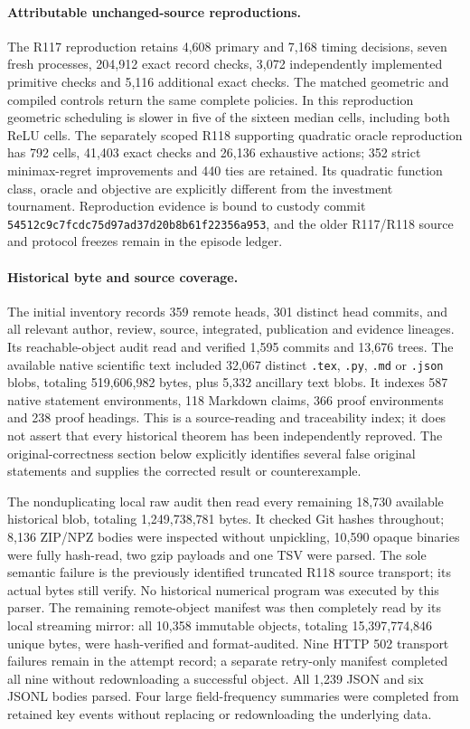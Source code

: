 \paragraph{Attributable unchanged-source reproductions.}
The R117 reproduction retains 4,608 primary and 7,168 timing decisions, seven
fresh processes, 204,912 exact record checks, 3,072 independently implemented
primitive checks and 5,116 additional exact checks. The matched geometric
and compiled controls return the same complete policies. In this reproduction
geometric scheduling is slower in five of the sixteen median cells,
including both ReLU cells. The separately scoped R118 supporting quadratic
oracle reproduction has 792 cells, 41,403 exact checks and 26,136 exhaustive
actions; 352 strict minimax-regret improvements and 440 ties are retained.
Its quadratic function class, oracle and objective are explicitly different
from the investment tournament. Reproduction evidence is bound to custody
commit \nolinkurl{54512c9c7fcdc75d97ad37d20b8b61f22356a953}, and the older
R117/R118 source and protocol freezes remain in the episode ledger.

\paragraph{Historical byte and source coverage.}
The initial inventory records 359 remote heads, 301 distinct head commits,
and all relevant author, review, source, integrated, publication and evidence
lineages. Its reachable-object audit read and verified 1,595 commits and
13,676 trees. The available native scientific text included 32,067 distinct
\texttt{.tex}, \texttt{.py}, \texttt{.md} or \texttt{.json} blobs, totaling
519,606,982 bytes, plus 5,332 ancillary text blobs. It indexes 587 native
statement environments, 118 Markdown claims, 366 proof environments and
238 proof headings. This is a source-reading and traceability index; it does
not assert that every historical theorem has been independently reproved.
The original-correctness section below explicitly identifies several false
original statements and supplies the corrected result or counterexample.

The nonduplicating local raw audit then read every remaining 18,730 available
historical blob, totaling 1,249,738,781 bytes. It checked Git hashes throughout;
8,136 ZIP/NPZ bodies were inspected without unpickling, 10,590 opaque binaries
were fully hash-read, two gzip payloads and one TSV were parsed. The sole
semantic failure is the previously identified truncated R118 source transport;
its actual bytes still verify. No historical numerical program was executed
by this parser. The remaining remote-object manifest was then completely read by its local
streaming mirror: all 10,358 immutable objects, totaling 15,397,774,846
unique bytes, were hash-verified and format-audited. Nine HTTP 502 transport
failures remain in the attempt record; a separate retry-only manifest
completed all nine without redownloading a successful object. All 1,239
JSON and six JSONL bodies parsed. Four large field-frequency summaries
were completed from retained key events without replacing or redownloading
the underlying data.

